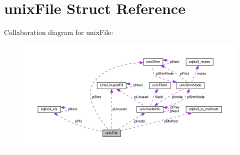 \hypertarget{structunixFile}{}\section{unix\+File Struct Reference}
\label{structunixFile}


Collaboration diagram for unix\+File\+:\nopagebreak
\begin{figure}[H]
\begin{center}
\leavevmode
\includegraphics[width=350pt]{structunixFile__coll__graph}
\end{center}
\end{figure}
